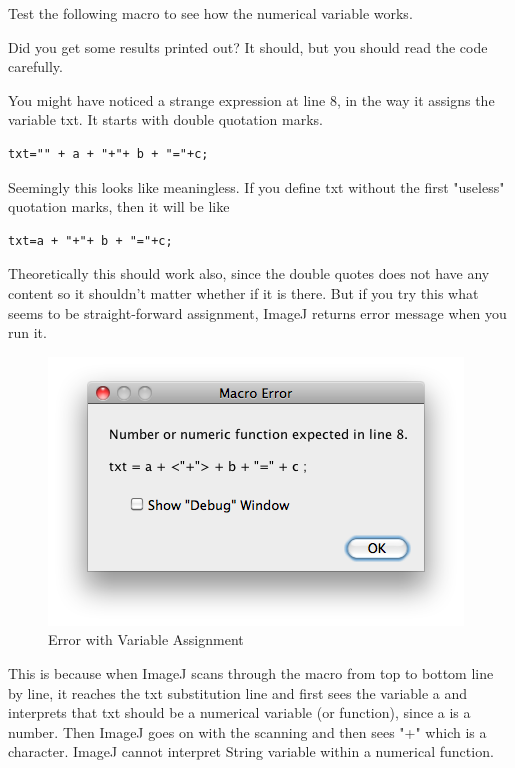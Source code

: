 \documentclass[11pt,a4paper,oneside]{report}
\begin{document}
Test the following macro to see how the numerical variable works. 

Did you get some results printed out? It should, but you should read the code carefully. 

You might have noticed a strange expression at line 8, in the way it assigns the variable txt. 
It starts with double quotation marks. \\
%
\begin{lstlisting}[numbers=none]
txt="" + a + "+"+ b + "="+c;
\end{lstlisting}
Seemingly this looks like meaningless. 
If you define txt without the first "useless" quotation marks, then it will be like\\
\begin{lstlisting}[numbers=none]
txt=a + "+"+ b + "="+c;
\end{lstlisting}
Theoretically this should work also, 
since the double quotes does not have any content so it shouldn't matter 
whether if it is there. But if you try this what seems to be straight-forward assignment, 
ImageJ returns error message when you run it. 

\begin{figure}[htbp]
\begin{center}
\includegraphics[scale=0.6]{fig/ErrorStringNumericFunction.png}
\caption{Error with Variable Assignment} \label{fig_ErrorVariable}
\end{center}
\end{figure}

This is because when ImageJ scans through the macro from top to bottom line by line, 
it reaches the txt substitution line and first sees the variable a and interprets that txt should be a numerical variable 
(or function), since a is a number. Then ImageJ goes on with the scanning and then sees "+" which is a character. 
ImageJ cannot interpret String variable within a numerical function. 
\end{document}
